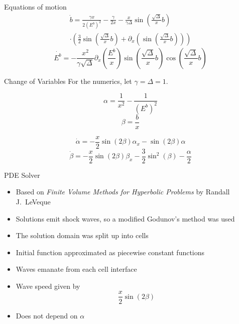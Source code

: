 \documentclass[12pt]{beamer}
\begin{document}
\begin{frame}{Equations of motion}
    \begin{multline*}
        \dot{b} = \frac{\gamma x}{2(E^b)^2} - \frac{\gamma}{2x} - \frac{x}{\gamma\Delta}
        \sin\left( \frac{\sqrt{\Delta}}{x}b \right) \\
        \cdot \left( \frac{3}{2}\sin\left( \frac{\sqrt{\Delta}}{x}b \right) + \partial_x
        \left( \sin\left(\frac{\sqrt{\Delta}}{x}b\right) \right) \right)
    \end{multline*}
    \[ \dot{E^b} = -\frac{x^2}{\gamma\sqrt{\Delta}} \partial_x \left( \frac{E^b}{x}
    \right) \sin \left( \frac{\sqrt{\Delta}}{x}b \right) \cos \left(
    \frac{\sqrt{\Delta}}{x}b \right) \]
\end{frame}

\begin{frame}{Change of Variables}
    For the numerics, let $\gamma=\Delta=1$.

    \[ \alpha = \frac{1}{x^2} - \frac{1}{(E^b)^2} \]
    \[ \beta = \frac{b}{x} \]

    \[ \dot{\alpha} = -\frac{x}{2}\sin(2\beta)\alpha_x - \sin(2\beta)\alpha \]
    \[ \dot{\beta} = -\frac{x}{2}\sin(2\beta)\beta_x - \frac{3}{2}\sin^2(\beta) -
    \frac{\alpha}{2} \]
\end{frame}

\begin{frame}{PDE Solver}
    \begin{itemize}
        \item Based on \textit{Finite Volume Methods for Hyperbolic Problems} by Randall
            J.\ LeVeque
        \item Solutions emit shock waves, so a modified Godunov's method was used
        \item The solution domain was split up into cells
        \item Initial function approximated as piecewise constant functions
        \item Waves emanate from each cell interface
        \item Wave speed given by
            \[ \frac{x}{2}\sin(2\beta) \]
        \item Does not depend on $\alpha$
    \end{itemize}
\end{frame}
\end{document}
